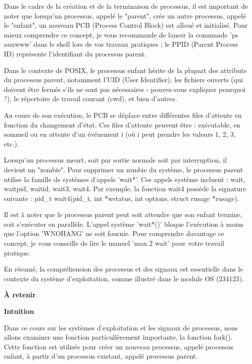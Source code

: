 \documentclass[12pt]{article}
\begin{document}
Dans le cadre de la création et de la terminaison de processus, il est important de noter que lorsqu'un processus, appelé le "parent", crée un autre processus, appelé le "enfant", un nouveau PCB (Process Control Block) est alloué et initialisé. Pour mieux comprendre ce concept, je vous recommande de lancer la commande 'ps auxwww' dans le shell lors de vos travaux pratiques ; le PPID (Parent Process ID) représente l'identifiant du processus parent. 

Dans le contexte de POSIX, le processus enfant hérite de la plupart des attributs du processus parent, notamment l'UID (User Identifier), les fichiers ouverts (qui doivent être fermés s'ils ne sont pas nécessaires - pouvez-vous expliquer pourquoi ?), le répertoire de travail courant (cwd), et bien d'autres. 

Au cours de son exécution, le PCB se déplace entre différentes files d'attente en fonction du changement d'état. Ces files d'attente peuvent être : exécutable, en sommeil ou en attente d'un événement i (où i peut prendre les valeurs 1, 2, 3, etc.). 

Lorsqu'un processus meurt, soit par sortie normale soit par interruption, il devient un "zombie". Pour supprimer un zombie du système, le processus parent utilise la famille de systèmes d'appels 'wait*'. Ces appels système incluent : wait, waitpid, waitid, wait3, wait4. Par exemple, la fonction wait4 possède la signature suivante : pid_t wait4(pid_t, int *wstatus, int options, struct rusage *rusage). 

Il est à noter que le processus parent peut soit attendre que son enfant termine, soit s'exécuter en parallèle. L'appel système 'wait*()' bloque l'exécution à moins que l'option 'WNOHANG' ne soit fournie. Pour comprendre davantage ce concept, je vous conseille de lire le manuel 'man 2 wait' pour votre travail pratique. 

En résumé, la compréhension des processus et des signaux est essentielle dans le contexte du système d'exploitation, comme illustré dans le module OS (234123).
\begin{tcolorbox}[colback=yellow!5, colframe=yellow!80!black, sharp corners, boxrule=0.8mm]
\textbf{À retenir}
\end{tcolorbox}
\begin{tcolorbox}[colback=green!5, colframe=green!80!black, sharp corners, boxrule=0.8mm]
\textbf{Intuition}
\end{tcolorbox}

Dans ce cours sur les systèmes d'exploitation et les signaux de processus, nous allons examiner une fonction particulièrement importante, la fonction fork(). Cette fonction est utilisée pour créer un nouveau processus, appelé processus enfant, à partir d'un processus existant, appelé processus parent.
\end{document}
